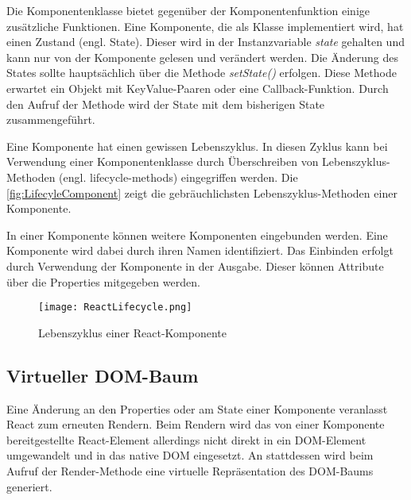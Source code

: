 Die Komponentenklasse bietet gegenüber der Komponentenfunktion einige zusätzliche Funktionen. Eine  Komponente, die als Klasse implementiert wird, hat einen Zustand (engl. State). Dieser wird in der Instanzvariable \textit{state} gehalten und kann nur von der Komponente gelesen und verändert werden. Die Änderung des States sollte hauptsächlich über die Methode \textit{setState()} erfolgen. Diese Methode  erwartet ein Objekt mit KeyValue-Paaren oder eine Callback-Funktion. Durch den Aufruf der Methode wird der State mit dem bisherigen State zusammengeführt.\autocites[vgl.][24\psq,89-93]{Zeigermann.2016}[vgl.][17\psq]{Stefanov.2017}

Eine Komponente hat einen gewissen Lebenszyklus. In diesen Zyklus kann bei Verwendung einer Komponentenklasse durch Überschreiben von Lebenszyklus-Methoden (engl. lifecycle-methods) eingegriffen werden. Die \autoref{fig:LifecyleComponent} zeigt die gebräuchlichsten Lebenszyklus-Methoden einer Komponente.\autocites[vgl.][96-100]{Zeigermann.2016}[vgl.][]{Facebook.2018b}

In einer Komponente können weitere Komponenten eingebunden werden. Eine Komponente wird dabei durch ihren Namen identifiziert. Das Einbinden erfolgt durch Verwendung der Komponente in der Ausgabe. Dieser können Attribute über die Properties mitgegeben werden.\autocites[vgl.][111\psqq]{Zeigermann.2016}


\begin{figure}
	\centering
	\texttt{[image: ReactLifecycle.png]}
	\caption{Lebenszyklus einer  React-Komponente} 
	\label{fig:LifecyleComponent}
\end{figure}



\subsection{Virtueller DOM-Baum}
Eine Änderung an den Properties oder am State einer Komponente veranlasst React zum erneuten Rendern. Beim Rendern wird das von einer Komponente bereitgestellte React-Element allerdings nicht direkt in ein DOM-Element umgewandelt und in das native DOM eingesetzt. An stattdessen wird beim Aufruf der Render-Methode eine virtuelle Repräsentation des DOM-Baums generiert.

